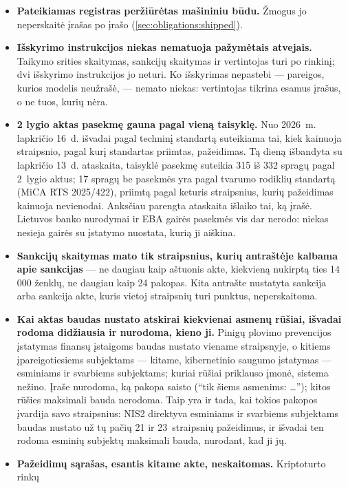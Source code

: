 \begin{itemize}
  \item \textbf{Pateikiamas registras peržiūrėtas mašininiu būdu.} Žmogus jo neperskaitė įrašas po
    įrašo (\cref{sec:obligations:shipped}).
  \item \textbf{Išskyrimo instrukcijos niekas nematuoja pažymėtais atvejais.} Taikymo srities
    skaitymas, sankcijų skaitymas ir vertintojas turi po rinkinį; dvi išskyrimo instrukcijos jo
    neturi. Ko išskyrimas nepastebi --- pareigos, kurios modelis neužrašė, --- nemato niekas:
    vertintojas tikrina esamus įrašus, o ne tuos, kurių nėra.
  \item \textbf{2 lygio aktas pasekmę gauna pagal vieną taisyklę.} Nuo 2026~m. lapkričio 16~d.
    išvadai pagal techninį standartą suteikiama tai, kiek kainuoja straipsnio, pagal kurį
    standartas priimtas, pažeidimas. Tą dieną išbandyta su lapkričio 13~d. ataskaita, taisyklė
    pasekmę suteikia 315 iš 332 spragų pagal 2~lygio aktus; 17 spragų be pasekmės yra pagal
    tvarumo rodiklių standartą (MiCA RTS 2025/422), priimtą pagal keturis straipsnius, kurių
    pažeidimas kainuoja nevienodai. Anksčiau parengta ataskaita išlaiko tai, ką įrašė.
    Lietuvos banko nurodymai ir EBA gairės pasekmės vis dar nerodo: niekas nesieja gairės su
    įstatymo nuostata, kurią ji aiškina.
  \item \textbf{Sankcijų skaitymas mato tik straipsnius, kurių antraštėje kalbama apie
    sankcijas} --- ne daugiau kaip aštuonis akte, kiekvieną nukirptą ties 14\,000 ženklų, ne
    daugiau kaip 24 pakopas. Kita antrašte nustatyta sankcija arba sankcija akte, kuris vietoj
    straipsnių turi punktus, neperskaitoma.
  \item \textbf{Kai aktas baudas nustato atskirai kiekvienai asmenų rūšiai, išvadai rodoma
    didžiausia ir nurodoma, kieno ji.} Pinigų plovimo prevencijos įstatymas finansų įstaigoms
    baudas nustato viename straipsnyje, o kitiems įpareigotiesiems subjektams --- kitame,
    kibernetinio saugumo įstatymas --- esminiams ir svarbiems subjektams; kuriai rūšiai
    priklauso įmonė, sistema nežino. Įraše nurodoma, ką pakopa saisto (\enquote{tik šiems
    asmenims: …}); kitos rūšies maksimali bauda nerodoma. Taip yra ir tada, kai tokios pakopos
    įvardija savo straipsnius: NIS2 direktyva esminiams ir svarbiems subjektams baudas nustato
    už tų pačių 21 ir 23~straipsnių pažeidimus, ir išvadai ten rodoma esminių subjektų
    maksimali bauda, nurodant, kad ji jų.
  \item \textbf{Pažeidimų sąrašas, esantis kitame akte, neskaitomas.} Kriptoturto rinkų

\end{itemize}
